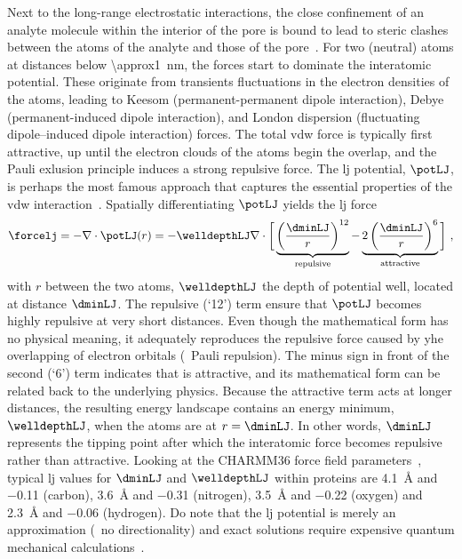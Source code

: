 Next to the long-range electrostatic interactions, the close confinement of an analyte molecule within the
interior of the pore is bound to lead to steric clashes between the atoms of the analyte and those of the
pore~\cite{Buchsbaum-2013}. For two (neutral) atoms at distances below \SI{\approx1}{\nm}, the 
forces start to dominate the interatomic potential. These originate from transients fluctuations in the
electron densities of the atoms, leading to Keesom (permanent-permanent dipole interaction), Debye
(permanent-induced dipole interaction), and London dispersion (fluctuating dipole–induced dipole interaction)
forces. The total \gls{vdw} force is typically first attractive, up until the electron clouds of the atoms
begin the overlap, and the Pauli exlusion principle induces a strong repulsive force. The \gls{lj} potential,
$\potLJ$, is perhaps the most famous approach that captures the essential properties of the \gls{vdw}
interaction~\cite{Paquet-2015}. Spatially differentiating $\potLJ$ yields the \gls{lj} force 
%
\begin{equation}
  \forcelj = - \nabla \cdot \potLJ( r ) = - \welldepthLJ \nabla \cdot \bigg[ 
    \underbrace{ \left( \dfrac{ \dminLJ }{ r } \right)^{12} }_{\text{repulsive}}
    -
    \underbrace{ 2 \left( \dfrac{ \dminLJ }{ r } \right)^{6} }_{\text{attractive}}
  \bigg]
  \text{ ,}
\end{equation}
% 
with $r$ between the two atoms, $\welldepthLJ$ the depth of potential well, located at distance $\dminLJ$. The
repulsive (`12') term ensure that $\potLJ$ becomes highly repulsive at very short distances. Even though the
mathematical form has no physical meaning, it adequately reproduces the repulsive force caused by yhe
overlapping of electron orbitals (\ie~Pauli repulsion). The minus sign in front of the second (`6') term
indicates that is attractive, and its mathematical form can be related back to the underlying physics. Because
the attractive term acts at longer distances, the resulting energy landscape contains an energy minimum,
$\welldepthLJ$, when the atoms are at $r = \dminLJ$. In other words, $\dminLJ$ represents the tipping point
after which the interatomic force becomes repulsive rather than attractive. Looking at the {CHARMM36} force
field parameters~\cite{Huang-2016}, typical \gls{lj} values for $\dminLJ$ and $\welldepthLJ$ within proteins
are \SI{4.1}{\angstrom} and \SI{-0.11}{\kbt} (carbon), \SI{3.6}{\angstrom} and \SI{-0.31}{\kbt} (nitrogen),
\SI{3.5}{\angstrom} and \SI{-0.22}{\kbt} (oxygen) and \SI{2.3}{\angstrom} and \SI{-0.06}{\kbt} (hydrogen). Do
note that the \gls{lj} potential is merely an approximation (\eg~no directionality) and exact solutions
require expensive quantum mechanical calculations~\cite{Paquet-2015}.

